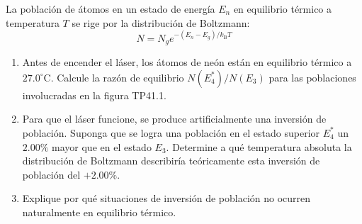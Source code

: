 \item La población de átomos en un estado de energía $E_n$ en equilibrio térmico a temperatura $T$ se rige por la distribución de Boltzmann:
$$ N = N_g e^{-(E_n - E_g)/k_{\text{B}}T} $$
\begin{enumerate}
    \item Antes de encender el láser, los átomos de neón están en equilibrio térmico a $27.0^\circ\text{C}$. Calcule la razón de equilibrio $N(E_4^*)/N(E_3)$ para las poblaciones involucradas en la figura TP41.1.
    \item Para que el láser funcione, se produce artificialmente una inversión de población. Suponga que se logra una población en el estado superior $E_4^*$ un $2.00\%$ mayor que en el estado $E_3$. Determine a qué temperatura absoluta la distribución de Boltzmann describiría teóricamente esta inversión de población del $+2.00\%$.
    \item Explique por qué situaciones de inversión de población no ocurren naturalmente en equilibrio térmico.
\end{enumerate}